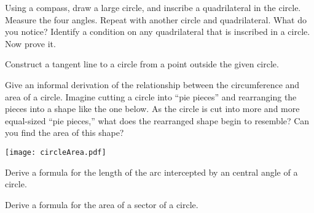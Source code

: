 \documentclass[nooutcomes]{ximera}
\begin{document}
\newpage
\begin{problem}
Using a compass, draw a large circle, and inscribe a quadrilateral in the circle.  Measure the four angles.  Repeat with another circle and quadrilateral.  What do you notice?  Identify a condition on any quadrilateral that is inscribed in a circle.  Now prove it.  
\vfill
\end{problem}

\begin{problem}
Construct a tangent line to a circle from a point outside the given circle.
\begin{image}
\end{image}
\end{problem}

\newpage
\begin{problem}
Give an informal derivation of the relationship between the circumference and area of a circle.  Imagine cutting a circle into ``pie pieces'' and rearranging the pieces into a shape like the one below.  As the circle is cut into more and more equal-sized ``pie pieces,'' what does the rearranged shape begin to resemble?  Can you find the area of this shape?  
\begin{image}
\texttt{[image: circleArea.pdf]}
\end{image}
\vfill
\end{problem}

\newpage
\begin{problem}
Derive a formula for the length of the arc intercepted by an central angle of a circle.  
\vfill
\end{problem}

\begin{problem}
Derive a formula for the area of a sector of a circle.  
\vfill
\end{problem}

\end{document}
